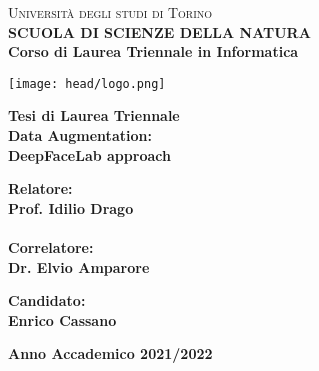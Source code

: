 \begin{titlepage}
\begin{center}
{{\Large{\textsc{Universit\`a degli studi di Torino \\}}}} \vspace{5mm} {\small{\bf SCUOLA DI SCIENZE DELLA NATURA\\ \vspace{3mm}
Corso di Laurea Triennale in Informatica}}
\vspace{5mm}
\end{center}
\begin{center}
\texttt{[image: head/logo.png]}
\end{center}
\begin{center}
\vspace{5mm}
{\large{\bf Tesi di Laurea Triennale\\}}
\vspace{5mm}
{\LARGE{\bf Data Augmentation: \\DeepFaceLab approach}}
\end{center}
\vspace{20mm}
\vspace{11mm}
\par
\noindent
\begin{minipage}[t]{0.47\textwidth}
{\large{\bf Relatore:\\
Prof. Idilio Drago}}\\
\vspace{4mm}
\\
{\large{\bf Correlatore:\\
Dr. Elvio Amparore}}
\vspace{8mm}
\end{minipage}
\hfill
\begin{minipage}[t]{0.47\textwidth}\raggedleft
\vspace{16mm}
{\large{\bf Candidato:\\
Enrico Cassano}}
\end{minipage}
\vspace{9mm}
\begin{center}
{\large{\bf 
Anno Accademico 2021/2022}}
\end{center}

\end{titlepage}
